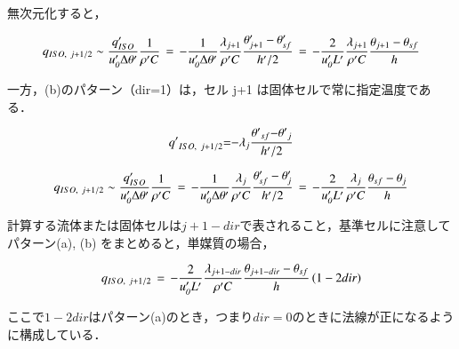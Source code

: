 \noindent 無次元化すると，

\begin{equation}
q_{ISO,\hspace{0.3em}j+1/2} 
\sim
\frac{q_{ISO}^{\prime}}{u_{\mathit{0}}^{\prime} \Delta \theta^{\prime}} \frac{1}{\rho^{\prime}C}
\,=\,
- \frac{1}{u_{\mathit{0}}^{\prime} \Delta \theta^{\prime}} \frac{\lambda_{j+1}}{\rho^{\prime}C}\frac{\theta_{j+1}^{\prime} - \theta_{sf}^{\prime}}{h^{\prime}\slash{2}}
\,=\,
- \frac{2}{u_{\mathit{0}}^{\prime} L^{\prime}} \frac{\lambda_{j+1}}{\rho^{\prime}C} \frac{\theta_{j+1} - \theta_{sf}}{h}
\label{eq:qiso2-1}
\end{equation}

一方，(b)のパターン（dir=1）は，セル j+1 は固体セルで常に指定温度である．

\begin{equation}
{{q}'}_{{ISO}{\mathrm{,}}\hspace{0.33em}{j}\mathrm{{+}}{1}{\mathrm{/}}{2}}\mathrm{{=}}\mathrm{{-}}{{\mathit{\lambda}}}_{j}\frac{{{\mathit{\theta}}'}_{sf}\mathrm{{-}}{{\mathit{\theta}}'}_{j}}{{{h}'}\slash{2}}
\label{eq:qiso2}
\end{equation}

\begin{equation}
q_{ISO,\hspace{0.3em}j+1/2} 
\sim
\frac{q_{ISO}^{\prime}}{u_{\mathit{0}}^{\prime} \Delta \theta^{\prime}} \frac{1}{\rho^{\prime}C}
\,=\,
- \frac{1}{u_{\mathit{0}}^{\prime} \Delta \theta^{\prime}} \frac{\lambda_{j}}{\rho^{\prime}C}\frac{\theta_{sf}^{\prime} - \theta_{j}^{\prime}}{h^{\prime}\slash{2}}
\,=\, - \frac{2}{u_{\mathit{0}}^{\prime} L^{\prime}} \frac{\lambda_{j}}{\rho^{\prime}C}\frac{\theta_{sf} -\theta_{j}}{h}
\label{eq:qiso3}
\end{equation}

\noindent 計算する流体または固体セルは$j+1-dir$で表されること，基準セルに注意してパターン(a), (b) をまとめると，単媒質の場合，

\begin{equation}
q_{ISO,\hspace{0.3em}j+1/2} 
\,=\,
- \frac{2}{u_{\mathit{0}}^{\prime} L^{\prime}} \frac{\lambda_{j+1-dir}}{\rho^{\prime}C}\frac{\theta_{j+1-dir}-\theta_{sf}}{h} \left( 1-2dir \right)
\label{eq:qiso4}
\end{equation}

\noindent ここで$1-2dir$はパターン(a)のとき，つまり$dir=0$のときに法線が正になるように構成している．\\

